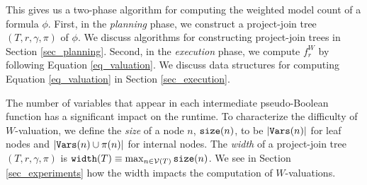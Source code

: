 This gives us a two-phase algorithm for computing the weighted model count of a formula $\phi$.
First, in the \emph{planning} phase, we construct a project-join tree $(T, r, \gamma, \pi)$ of $\phi$.
We discuss algorithms for constructing project-join trees in Section \ref{sec_planning}.
Second, in the \emph{execution} phase, we compute $f^W_r$ by following Equation \eqref{eq_valuation}.
We discuss data structures for computing Equation \eqref{eq_valuation} in Section \ref{sec_execution}.

The number of variables that appear in each intermediate pseudo-Boolean function has a significant impact on the runtime.
To characterize the difficulty of $W$-valuation, we define the \emph{size} of a node $n$, $\texttt{\upshape size}(n)$, to be $\left| \texttt{\upshape Vars}(n) \right|$ for leaf nodes and $\left| \texttt{\upshape Vars}(n) \cup \pi(n) \right|$ for internal nodes.
The \emph{width} of a project-join tree $(T, r, \gamma, \pi)$ is $\texttt{\upshape width}(T) \equiv \max_{n \in \mathcal{V}(T)} \texttt{\upshape size}(n)$.
We see in Section \ref{sec_experiments} how the width impacts the computation of $W$-valuations.







